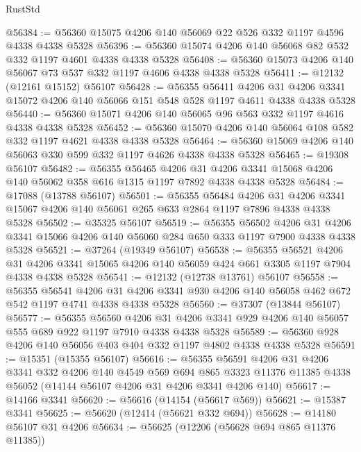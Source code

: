 \begin{lexlean}{RustStd}
\begin{coremodule}
{\begin{coremodule}
{{{{{{{{{{{{{{{{{{{{{{{{{{{{{{{{{{{{{{{{{{{{{{{{{{@56384 := @56360 @15075 @4206 @140 @56069 @22 @526 @332 @1197 @4596 @4338 @4338 @5328
@56396 := @56360 @15074 @4206 @140 @56068 @82 @532 @332 @1197 @4601 @4338 @4338 @5328
@56408 := @56360 @15073 @4206 @140 @56067 @73 @537 @332 @1197 @4606 @4338 @4338 @5328
@56411 := @12132 (@12161 @15152) @56107
@56428 := @56355
    @56411
    @4206
    @31
    @4206
    @3341
    @15072
    @4206
    @140
    @56066
    @151
    @548
    @528
    @1197
    @4611
    @4338
    @4338
    @5328
@56440 := @56360 @15071 @4206 @140 @56065 @96 @563 @332 @1197 @4616 @4338 @4338 @5328
@56452 := @56360 @15070 @4206 @140 @56064 @108 @582 @332 @1197 @4621 @4338 @4338 @5328
@56464 := @56360 @15069 @4206 @140 @56063 @330 @599 @332 @1197 @4626 @4338 @4338 @5328
@56465 := @19308 @56107
@56482 := @56355
    @56465
    @4206
    @31
    @4206
    @3341
    @15068
    @4206
    @140
    @56062
    @358
    @616
    @1315
    @1197
    @7892
    @4338
    @4338
    @5328
@56484 := @17088 (@13788 @56107)
@56501 := @56355
    @56484
    @4206
    @31
    @4206
    @3341
    @15067
    @4206
    @140
    @56061
    @265
    @633
    @2864
    @1197
    @7896
    @4338
    @4338
    @5328
@56502 := @35325 @56107
@56519 := @56355
    @56502
    @4206
    @31
    @4206
    @3341
    @15066
    @4206
    @140
    @56060
    @284
    @650
    @333
    @1197
    @7900
    @4338
    @4338
    @5328
@56521 := @37264 (@19349 @56107)
@56538 := @56355
    @56521
    @4206
    @31
    @4206
    @3341
    @15065
    @4206
    @140
    @56059
    @424
    @661
    @3305
    @1197
    @7904
    @4338
    @4338
    @5328
@56541 := @12132 (@12738 @13761) @56107
@56558 := @56355
    @56541
    @4206
    @31
    @4206
    @3341
    @930
    @4206
    @140
    @56058
    @462
    @672
    @542
    @1197
    @4741
    @4338
    @4338
    @5328
@56560 := @37307 (@13844 @56107)
@56577 := @56355
    @56560
    @4206
    @31
    @4206
    @3341
    @929
    @4206
    @140
    @56057
    @555
    @689
    @922
    @1197
    @7910
    @4338
    @4338
    @5328
@56589 := @56360 @928 @4206 @140 @56056 @403 @404 @332 @1197 @4802 @4338 @4338 @5328
@56591 := @15351 (@15355 @56107)
@56616 := @56355
    @56591
    @4206
    @31
    @4206
    @3341
    @332
    @4206
    @140
    @4549
    @569
    @694
    @865
    @3323
    @11376
    @11385
    @4338
    @56052
    (@14144 @56107 @4206 @31 @4206 @3341 @4206 @140)
@56617 := @14166 @3341
@56620 := @56616 (@14154 (@56617 @569))
@56621 := @15387 @3341
@56625 := @56620 (@12414 (@56621 @332 @694))
@56628 := @14180 @56107 @31 @4206
@56634 := @56625 (@12206 (@56628 @694 @865 @11376 @11385))
}}}}}}}}}}}}}}}}}}}}}}}}}}}}}}}}}}}}}}}}}}}}}}}}}}
\end{coremodule}}
\end{coremodule}
\end{lexlean}
